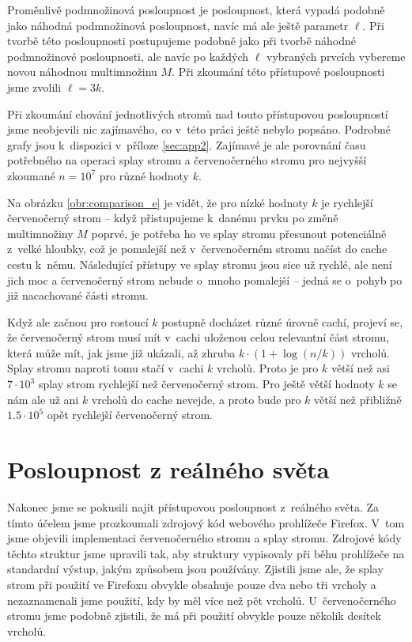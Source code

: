 Proměnlivě podmnožinová posloupnost je posloupnost, která vypadá podobně jako náhodná podmnožinová posloupnost, navíc má ale ještě parametr $\ell$. Při tvorbě této posloupnosti postupujeme podobně jako při tvorbě náhodné podmnožinové posloupnosti, ale navíc po každých $\ell$ vybraných prvcích vybereme novou náhodnou multimnožinu $M$. Při zkoumání této přístupové posloupnosti jsme zvolili $\ell = 3k$.


Při zkoumání chování jednotlivých stromů nad touto přístupovou posloupností jsme neobjevili nic zajímavého, co v~této práci ještě nebylo popsáno. Podrobné grafy jsou k~dispozici v~příloze \ref{sec:app2}. Zajímavé je ale porovnání času potřebného na operaci splay stromu a červenočerného stromu pro nejvyšší zkoumané $n=10^7$ pro různé hodnoty $k$.

Na obrázku \ref{obr:comparison_e} je vidět, že pro nízké hodnoty $k$ je
rychlejší červenočerný strom -- když přistupujeme k~danému prvku po změně
multimnožiny $M$ poprvé, je potřeba ho ve splay stromu přesunout potenciálně
z~velké hloubky, což je pomalejší než v~červenočerném stromu načíst do cache
cestu k~němu. Následující přístupy ve splay stromu jsou sice už rychlé, ale
není jich moc a červenočerný strom nebude o~mnoho pomalejší -- jedná se
o~pohyb po již nacachované části stromu. 

Když ale začnou pro rostoucí $k$
postupně docházet různé úrovně cachí, projeví se, že  červenočerný strom musí mít v~cachi uloženou celou relevantní část stromu, která může mít, jak jsme již ukázali, až zhruba $k \cdot (1+\log(n/k))$ vrcholů. Splay stromu naproti tomu stačí v~cachi $k$ vrcholů. Proto je pro $k$ větší než asi $7\cdot10^3$ splay strom rychlejší než červenočerný strom. Pro ještě větší hodnoty $k$ se nám ale už ani $k$ vrcholů do cache nevejde, a proto bude pro $k$ větší než přibližně $1.5\cdot 10^5$ opět rychlejší červenočerný strom.

\section{Posloupnost z reálného světa}


Nakonec jsme se pokusili najít přístupovou posloupnost z~reálného světa. Za tímto účelem jsme prozkoumali zdrojový kód webového prohlížeče Firefox. V~tom jsme objevili implementaci červenočerného stromu a splay stromu. Zdrojové kódy těchto struktur jsme upravili tak, aby struktury vypisovaly při běhu prohlížeče na standardní výstup, jakým způsobem jsou používány. Zjistili jsme ale, že splay strom při použití ve Firefoxu obvykle obsahuje pouze dva nebo tři vrcholy a nezaznamenali jsme použití, kdy by měl více než pět vrcholů. U~červenočerného stromu jsme podobně zjistili, že má při použití obvykle pouze několik desítek vrcholů.

